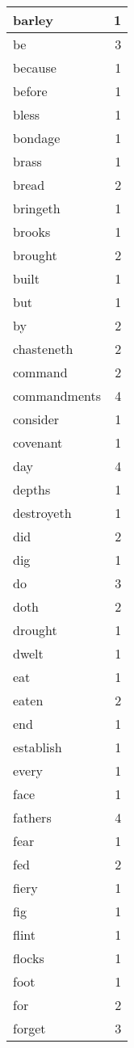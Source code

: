 \begin{center}
\begin{longtable}{l|r}
barley & 1 \\ \hline
be & 3 \\ \hline
because & 1 \\ \hline
before & 1 \\ \hline
bless & 1 \\ \hline
bondage & 1 \\ \hline
brass & 1 \\ \hline
bread & 2 \\ \hline
bringeth & 1 \\ \hline
brooks & 1 \\ \hline
brought & 2 \\ \hline
built & 1 \\ \hline
but & 1 \\ \hline
by & 2 \\ \hline
chasteneth & 2 \\ \hline
command & 2 \\ \hline
commandments & 4 \\ \hline
consider & 1 \\ \hline
covenant & 1 \\ \hline
day & 4 \\ \hline
depths & 1 \\ \hline
destroyeth & 1 \\ \hline
did & 2 \\ \hline
dig & 1 \\ \hline
do & 3 \\ \hline
doth & 2 \\ \hline
drought & 1 \\ \hline
dwelt & 1 \\ \hline
eat & 1 \\ \hline
eaten & 2 \\ \hline
end & 1 \\ \hline
establish & 1 \\ \hline
every & 1 \\ \hline
face & 1 \\ \hline
fathers & 4 \\ \hline
fear & 1 \\ \hline
fed & 2 \\ \hline
fiery & 1 \\ \hline
fig & 1 \\ \hline
flint & 1 \\ \hline
flocks & 1 \\ \hline
foot & 1 \\ \hline
for & 2 \\ \hline
forget & 3 \\ \hline

\end{longtable}
\end{center}
